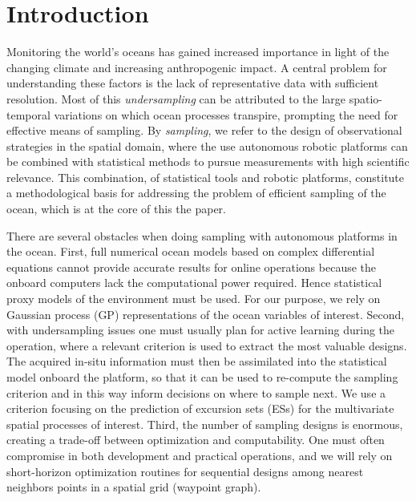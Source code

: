 \documentclass[aoas]{imsart}
\begin{document}
\section{Introduction}

Monitoring the world's oceans has gained increased importance in 
light of the changing climate and increasing anthropogenic impact. A
central problem for understanding these factors is the lack of
representative data with sufficient resolution. Most of this
\emph{undersampling} can be attributed to the large spatio-temporal
variations on which ocean processes transpire, prompting the need for
effective means of sampling. By \emph{sampling}, we refer to the design of observational strategies in the spatial domain, where the use autonomous robotic platforms can be combined with statistical methods to pursue measurements with high scientific relevance. This combination, of statistical tools and robotic platforms, constitute a methodological basis for addressing the problem of efficient sampling of the ocean, which is at the core of this the paper. 

There are several obstacles when doing sampling with autonomous platforms in the ocean. First, full numerical ocean models based on complex differential equations cannot provide accurate results for online operations because the onboard computers lack the computational power required. Hence statistical proxy models of the environment must be used. For our purpose, we rely on Gaussian process (GP) representations of the ocean variables of interest. Second, with undersampling issues one must usually plan for active learning during the operation, where a relevant criterion is used to extract the most valuable designs. The acquired in-situ information must then be assimilated into the statistical model onboard the platform, so that it can be used to re-compute the sampling criterion and in this way inform decisions on where to sample next. We use a criterion focusing on the prediction of excursion sets (ESs) for the multivariate spatial processes of interest. Third, the number of sampling designs is enormous, creating a trade-off between optimization and computability. One must often compromise in both development and practical operations, and we will rely on short-horizon optimization routines for sequential designs among nearest neighbors points in a spatial grid (waypoint graph).
\end{document}
